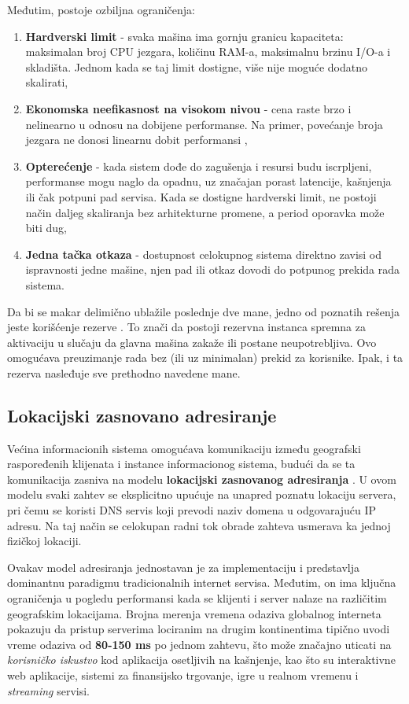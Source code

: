 Međutim, postoje ozbiljna ograničenja:
\begin{enumerate}
\item \textbf{Hardverski limit} - svaka mašina ima gornju granicu kapaciteta: maksimalan broj CPU jezgara, količinu RAM-a, maksimalnu brzinu I/O-a i skladišta. Jednom kada se taj limit dostigne, više nije moguće dodatno skalirati,
\item \textbf{Ekonomska neefikasnost na visokom nivou} - cena raste brzo i nelinearno u odnosu na dobijene performanse. Na primer, povećanje broja jezgara ne donosi linearnu dobit performansi \cite{hill2008amdahl},
\item \textbf{Opterećenje} - kada sistem dođe do zagušenja i resursi budu iscrpljeni, performanse mogu naglo da opadnu, uz značajan porast latencije, kašnjenja ili čak potpuni pad servisa. Kada se dostigne hardverski limit, ne postoji način daljeg skaliranja bez arhitekturne promene, a period oporavka može biti dug,
\item \textbf{Jedna tačka otkaza} - dostupnost celokupnog sistema direktno zavisi od ispravnosti jedne mašine, njen pad ili otkaz dovodi do potpunog prekida rada sistema.
\end{enumerate}

Da bi se makar delimično ublažile poslednje dve mane, jedno od poznatih rešenja jeste korišćenje rezerve . To znači da postoji rezervna instanca spremna za aktivaciju u slučaju da glavna mašina zakaže ili postane neupotrebljiva. Ovo omogućava preuzimanje rada bez (ili uz minimalan) prekid za korisnike. Ipak, i ta rezerva nasleđuje sve prethodno navedene mane.

\subsection{Lokacijski zasnovano adresiranje}\label{section:location-based}
Većina informacionih sistema omogućava komunikaciju između geografski raspoređenih klijenata i instance informacionog sistema, budući da se ta komunikacija zasniva na modelu \textbf{lokacijski zasnovanog adresiranja}  \cite{ding2011location}. U ovom modelu svaki zahtev se eksplicitno upućuje na unapred poznatu lokaciju servera, pri čemu se koristi DNS servis koji prevodi naziv domena u odgovarajuću IP adresu. Na taj način se celokupan radni tok obrade zahteva usmerava ka jednoj fizičkoj lokaciji.

Ovakav model adresiranja jednostavan je za implementaciju i predstavlja dominantnu paradigmu tradicionalnih internet servisa. Međutim, on ima ključna ograničenja u pogledu performansi kada se klijenti i server nalaze na različitim geografskim lokacijama. Brojna merenja vremena odaziva globalnog interneta pokazuju da pristup serverima lociranim na drugim kontinentima tipično uvodi vreme odaziva od \textbf{80-150 ms} \cite{kufel2015network} po jednom zahtevu, što može značajno uticati na \textit{korisničko iskustvo} kod aplikacija osetljivih na kašnjenje, kao što su interaktivne web aplikacije, sistemi za finansijsko trgovanje, igre u realnom vremenu i \textit{streaming} servisi.

